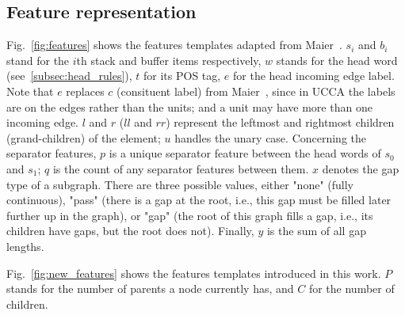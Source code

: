 \documentclass[11pt]{article}
\begin{document}
\subsection{Feature representation}
\label{subsec:features}

Fig.~\ref{fig:features} shows the features templates adapted from Maier~. $s_i$ and $b_i$ stand for the $i$th stack and buffer items respectively, $w$ stands for the head word (see~\ref{subsec:head_rules}), $t$ for its POS tag, $e$ for the head incoming edge label. Note that $e$ replaces $c$ (consituent label) from Maier~, since in UCCA the labels are on the edges rather than the units; and a unit may have more than one incoming edge. $l$ and $r$ ($ll$ and $rr$) represent the leftmost and rightmost children (grand-children) of the element; $u$ handles the unary case.
Concerning the separator features, $p$ is a unique separator feature between the head words of $s_0$ and $s_1$; $q$ is the count of any separator features between them.
$x$ denotes the gap type of a subgraph. There are three possible values, either "none" (fully continuous), "pass" (there is a gap at the root, i.e., this gap must be filled later further up in the graph), or "gap" (the root of this graph fills a gap, i.e., its children have gaps, but the root does not). Finally, $y$ is the sum of all gap lengths.

Fig.~\ref{fig:new_features} shows the features templates introduced in this work. $P$ stands for the number of parents a node currently has, and $C$ for the number of children.
\end{document}
